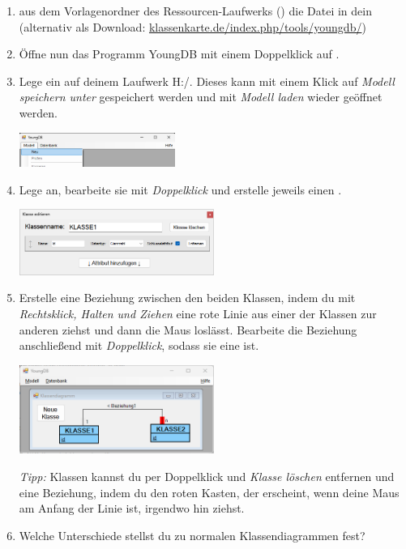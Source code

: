 
\begin{enumerate}
    \item {} aus dem Vorlagenordner des Ressourcen-Laufwerks () die Datei  in dein   (alternativ als Download: \url{klassenkarte.de/index.php/tools/youngdb/})
    \item Öffne nun das Programm YoungDB mit einem Doppelklick auf .
    \item Lege ein  auf deinem Laufwerk H:/. Dieses kann mit einem Klick auf \emph{Modell speichern unter} gespeichert werden und mit \emph{Modell laden} wieder geöffnet werden.
    
    \includegraphics[width=0.4\textwidth]{img/YDB_ModellNeu.png}
    \item Lege  an, bearbeite sie mit \emph{Doppelklick} und erstelle jeweils einen .


    \includegraphics[width=0.5\textwidth]{img/YDB_idErstellen.png}
    \item Erstelle eine Beziehung zwischen den beiden Klassen, indem du mit \emph{Rechtsklick, Halten und Ziehen} eine rote Linie aus einer der Klassen zur anderen ziehst und dann die Maus loslässt. Bearbeite die Beziehung anschließend mit \emph{Doppelklick}, sodass sie eine  ist.
    
    \includegraphics[width=0.5\textwidth]{img/YDB_1nBeziehung.png}
    
    \emph{Tipp:} Klassen kannst du per Doppelklick und \emph{Klasse löschen} entfernen und eine Beziehung, indem du den roten Kasten, der erscheint, wenn deine Maus am Anfang der Linie ist, irgendwo hin ziehst.
    \item {} Welche Unterschiede stellst du zu normalen Klassendiagrammen fest?
    

\end{enumerate}
